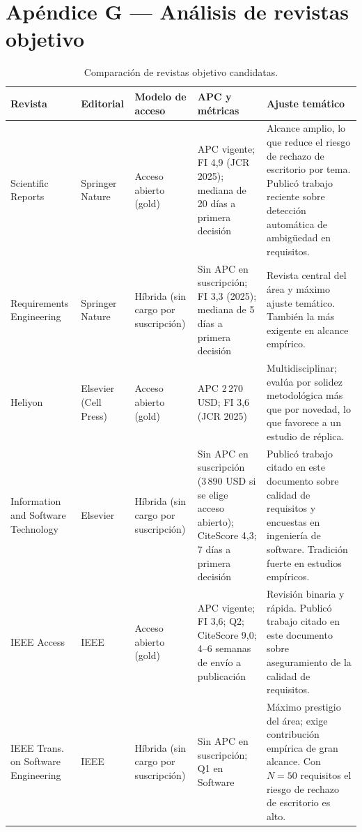 \documentclass[journal,onecolumn]{IEEEtran}
\begin{document}
	\section*{Apéndice G --- Análisis de revistas objetivo}
	\label{ap:revistas}
	
	\begin{table}[H]
		\centering
		\caption{Comparación de revistas objetivo candidatas.}
		\label{tab:revistas}
		\small
		\begin{tabularx}{\textwidth}{@{}p{3.0cm} p{1.7cm} p{1.5cm} p{2.4cm} X@{}}
			\toprule
			\textbf{Revista} & \textbf{Editorial} & \textbf{Modelo de acceso} & \textbf{APC y métricas} & \textbf{Ajuste temático} \\
			\midrule
			Scientific Reports & Springer Nature & Acceso abierto (gold) & APC vigente; FI 4,9 (JCR 2025); mediana de 20 días a primera decisión & Alcance amplio, lo que reduce el riesgo de rechazo de escritorio por tema. Publicó trabajo reciente sobre detección automática de ambigüedad en requisitos. \\
			\addlinespace
			Requirements Engineering & Springer Nature & Híbrida (sin cargo por suscripción) & Sin APC en suscripción; FI 3,3 (2025); mediana de 5 días a primera decisión & Revista central del área y máximo ajuste temático. También la más exigente en alcance empírico. \\
			\addlinespace
			Heliyon & Elsevier (Cell Press) & Acceso abierto (gold) & APC 2\,270 USD; FI 3,6 (JCR 2025) & Multidisciplinar; evalúa por solidez metodológica más que por novedad, lo que favorece a un estudio de réplica. \\
			\addlinespace
			Information and Software Technology & Elsevier & Híbrida (sin cargo por suscripción) & Sin APC en suscripción (3\,890 USD si se elige acceso abierto); CiteScore 4,3; 7 días a primera decisión & Publicó trabajo citado en este documento sobre calidad de requisitos y encuestas en ingeniería de software. Tradición fuerte en estudios empíricos. \\
			\addlinespace
			IEEE Access & IEEE & Acceso abierto (gold) & APC vigente; FI 3,6; Q2; CiteScore 9,0; 4--6 semanas de envío a publicación & Revisión binaria y rápida. Publicó trabajo citado en este documento sobre aseguramiento de la calidad de requisitos. \\
			\addlinespace
			IEEE Trans. on Software Engineering & IEEE & Híbrida (sin cargo por suscripción) & Sin APC en suscripción; Q1 en Software & Máximo prestigio del área; exige contribución empírica de gran alcance. Con $N = 50$ requisitos el riesgo de rechazo de escritorio es alto. \\
			\bottomrule
		\end{tabularx}
	\end{table}
	
\end{document}
